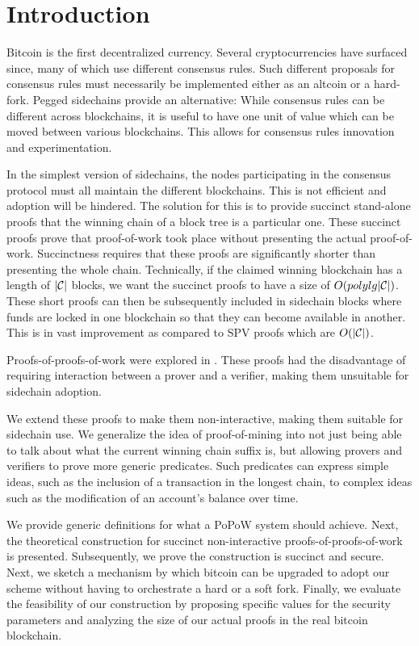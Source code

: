 \section{Introduction}

Bitcoin \cite{bitcoin} is the first decentralized currency. Several
cryptocurrencies have surfaced since, many of which use different consensus
rules. Such different proposals for consensus rules must necessarily be
implemented either as an altcoin or a hard-fork. Pegged sidechains provide an
alternative: While consensus rules can be different across blockchains, it is
useful to have one unit of value which can be moved between various
blockchains. This allows for consensus rules innovation and experimentation.

In the simplest version of sidechains, the nodes participating in the consensus
protocol must all maintain the different blockchains. This is not efficient and
adoption will be hindered. The solution for this is to provide succinct
stand-alone proofs that the winning chain of a block tree is a particular one.
These succinct proofs prove that proof-of-work took place without presenting
the actual proof-of-work. Succinctness requires that these proofs are
significantly shorter than presenting the whole chain. Technically, if the
claimed winning blockchain has a length of $|\mathcal{C}|$ blocks, we want the
succinct proofs to have a size of $O(polylg|\mathcal{C}|)$. These short proofs can
then be subsequently included in sidechain blocks where funds are locked in one
blockchain so that they can become available in another. This is in vast
improvement as compared to SPV proofs which are $O(|\mathcal{C}|)$.

Proofs-of-proofs-of-work were explored in \cite{KLS}. These proofs
had the disadvantage of requiring interaction between a prover and a verifier,
making them unsuitable for sidechain adoption.

We extend these proofs to make them non-interactive, making them suitable for
sidechain use. We generalize the idea of proof-of-mining into not just being
able to talk about what the current winning chain suffix is, but allowing
provers and verifiers to prove more generic predicates. Such predicates can
express simple ideas, such as the inclusion of a transaction in the longest
chain, to complex ideas such as the modification of an account's balance over
time.

We provide generic definitions for what a PoPoW system should achieve. Next,
the theoretical construction for succinct non-interactive
proofs-of-proofs-of-work is presented. Subsequently, we prove the construction
is succinct and secure. Next, we sketch a mechanism by which bitcoin can be
upgraded to adopt our scheme without having to orchestrate a hard or a soft
fork. Finally, we evaluate the feasibility of our construction by proposing
specific values for the security parameters and analyzing the size of our
actual proofs in the real bitcoin blockchain.
